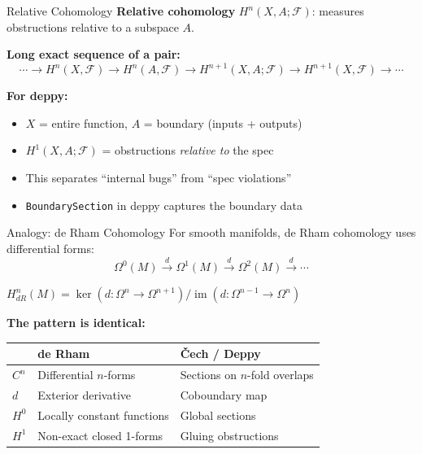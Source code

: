 \documentclass[aspectratio=169,10pt]{beamer}
\newcommand{\Fscr}{\mathcal{F}}
\newcommand{\im}{\operatorname{im}}
\begin{document}
\begin{frame}{Relative Cohomology}
\textbf{Relative cohomology} $H^n(X, A; \Fscr)$: measures obstructions relative to a subspace $A$.

\vspace{0.3em}
\textbf{Long exact sequence of a pair:}
\[
\cdots \to H^n(X, \Fscr) \to H^n(A, \Fscr) \to H^{n+1}(X, A; \Fscr) \to H^{n+1}(X, \Fscr) \to \cdots
\]

\vspace{0.3em}
\textbf{For deppy:}
\begin{itemize}
  \item $X$ = entire function, $A$ = boundary (inputs + outputs)
  \item $H^1(X, A; \Fscr)$ = obstructions \emph{relative to} the spec
  \item This separates ``internal bugs'' from ``spec violations''
  \item \texttt{BoundarySection} in deppy captures the boundary data
\end{itemize}
\end{frame}

\begin{frame}{Analogy: de Rham Cohomology}
For smooth manifolds, de Rham cohomology uses differential forms:
\[
\Omega^0(M) \xrightarrow{d} \Omega^1(M) \xrightarrow{d} \Omega^2(M) \xrightarrow{d} \cdots
\]

$H^n_{dR}(M) = \ker(d : \Omega^n \to \Omega^{n+1}) / \im(d : \Omega^{n-1} \to \Omega^n)$

\vspace{0.3em}
\textbf{The pattern is identical:}
\begin{center}
\renewcommand{\arraystretch}{1.3}
\begin{tabular}{@{}lll@{}}
\toprule
& \textbf{de Rham} & \textbf{\v{C}ech / Deppy} \\
\midrule
$C^n$ & Differential $n$-forms & Sections on $n$-fold overlaps \\
$d$ & Exterior derivative & Coboundary map \\
$H^0$ & Locally constant functions & Global sections \\
$H^1$ & Non-exact closed 1-forms & Gluing obstructions \\
\bottomrule
\end{tabular}
\end{center}
\end{frame}
\end{document}
